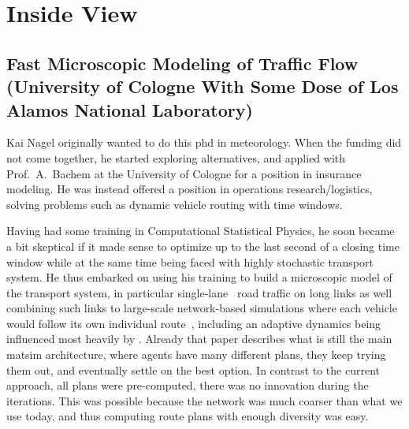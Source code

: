 \section{Inside View}


\subsection{Fast Microscopic Modeling of Traffic Flow (University of Cologne With Some Dose of Los Alamos National Laboratory)}
\label{sec:history-u-of-cologne-phase}

Kai Nagel originally wanted to do this \gls{phd} in meteorology.  When the funding did not come together, he started exploring alternatives, and applied with Prof.\ A.\ Bachem at the University of Cologne for a position in insurance modeling.  He was instead offered a position in operations research/logistics, solving problems such as dynamic vehicle routing with time windows. 

Having had some training in Computational Statistical Physics, he soon became a bit skeptical if it made sense to optimize up to the last second of a closing time window while at the same time being faced with highly stochastic transport system.  He thus embarked on using his training to build a microscopic model of the transport system, in particular single-lane~\citep{NagelSchreckenberg1992CA,Nagel1999flowTheoTrr} road traffic on long links as well combining such links to large-scale network-based simulations where each vehicle would follow its own individual route~\citep{Nagel1996NRW}, including an adaptive dynamics being influenced most heavily by \cite{ArthurBar}.  Already that paper describes what is still the main \gls{matsim} architecture, where agents have many different plans, they keep trying them out, and eventually settle on the best option.  In contrast to the current approach, all plans were pre-computed, \ie there was no innovation during the iterations.  This was possible because the network was much coarser than what we use today, and thus computing route plans with enough diversity was easy.

